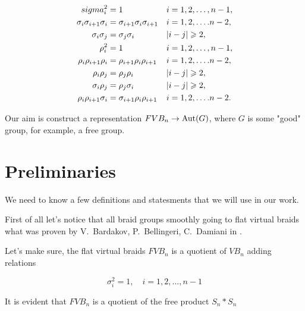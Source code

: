 \documentclass{article}
\begin{document}
\begin{align}

\notag sigma_i^2&=1 && i = 1, 2, \dots,n-1,\\

\notag \sigma_i\sigma _{i+1}\sigma _i &= \sigma _{i+1}\sigma _i\sigma _{i+1}&& i = 1, 2, \dots. n-2, \\

\notag \sigma _i\sigma _j &= \sigma _j\sigma _i && |i-j|\geqslant   2,\\

\notag \rho_i^2&=1 &&i = 1, 2, \dots,n-1, \\

\label{def} \rho_i\rho _{i+1}\rho _i &= \rho _{i+1}\rho_i\rho _{i+1} &&i = 1, 2, \dots. n-2,\\

\notag \rho _i\rho _j &= \rho _j\rho _i && |i-j|\geqslant 2,\\

\notag \sigma _i\rho _j &= \rho _j\sigma _i &&|i-j|\geqslant   2,\\

\notag \rho_i\rho _{i+1}\sigma _i &= \sigma _{i+1}\rho_i\rho _{i+1} && i = 1, 2, \dots. n-2.\\

\end{align}




Our aim is construct a representation $FVB_n \rightarrow {\rm Aut} (G)$, where $G$ is some "good" group, for example, a free group.

\section{Preliminaries}



We need to know a few definitions and statesments that we will use in our work.



First of all let's notice that all braid groups smoothly going to flat virtual braids what was proven by V.~Bardakov, P.~Bellingeri, C.~Damiani in \cite{BarBelDom}. 



Let's make sure, the flat virtual braids $FVB_n$ is a quotient of $VB_n$ adding relations 

$$ \sigma_i^2=1, \quad i = 1, 2, \dots,n-1 $$



It is evident that $FVB_n$ is a quotient of the free product $S_n*S_n$
\end{document}
